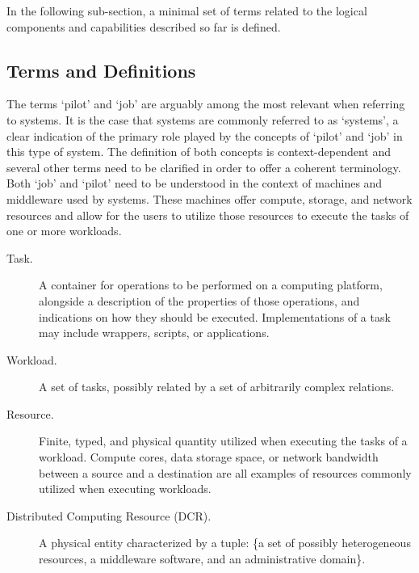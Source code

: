 \documentclass{sig-alternate}
\begin{document}
In the following sub-section, a minimal set of terms related to the logical
components and capabilities described so far is defined.

\subsection{Terms and Definitions}
\label{sec:termsdefs}

The terms `pilot' and `job' are arguably among the most relevant when referring
to \pilotjob systems. It is the case that \pilotjob systems are commonly
referred to as `\pilotjob systems', a clear indication of the primary role
played by the concepts of `pilot' and `job' in this type of system. The
definition of both concepts is context-dependent and several other terms need to
be clarified in order to offer a coherent terminology. Both `job' and `pilot'
need to be understood in the context of machines and middleware used by
\pilotjob systems. These machines offer compute, storage, and network resources
and \pilots allow for the users to utilize those resources to execute the tasks
of one or more workloads.

 

\begin{description}

\item[Task.] A container for operations to be performed on a computing
platform, alongside a description of the properties of those operations, and
indications on how they should be executed. Implementations of a task may
include wrappers, scripts, or applications.

\item[Workload.] A set of tasks, possibly related by a set of arbitrarily
complex relations.

\item[Resource.] Finite, typed, and physical quantity utilized when executing
the tasks of a workload. Compute cores, data storage space, or network
bandwidth between a source and a destination are all examples of resources
commonly utilized when executing workloads.

\item[Distributed Computing Resource (DCR).] A physical entity characterized by
a tuple: \{a set of possibly heterogeneous resources, a middleware software, and
an administrative domain\}.

\end{description}
\end{document}
